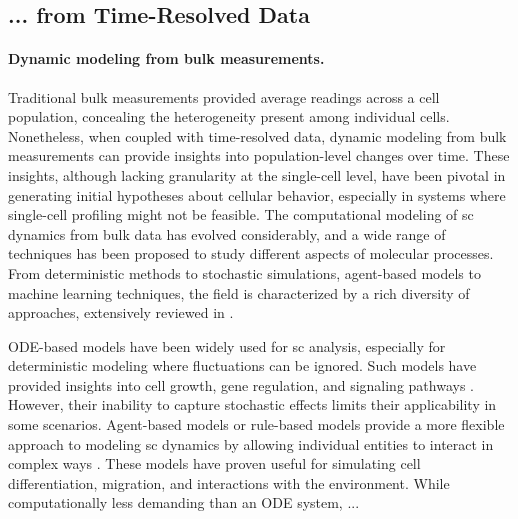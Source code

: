 
\subsection*{... from Time-Resolved Data}

\paragraph{Dynamic modeling from bulk measurements.}

Traditional bulk measurements provided average readings across a cell population, concealing the heterogeneity present among individual cells. Nonetheless, when coupled with time-resolved data, dynamic modeling from bulk measurements can provide insights into population-level changes over time. These insights, although lacking granularity at the single-cell level, have been pivotal in generating initial hypotheses about cellular behavior, especially in systems where single-cell profiling might not be feasible. The computational modeling of \acrlong{sc} dynamics from bulk data has evolved considerably, and a wide range of techniques has been proposed to study different aspects of molecular processes. From deterministic methods to stochastic simulations, agent-based models to machine learning techniques, the field is characterized by a rich diversity of approaches, extensively reviewed in \citep{klipp2016systems}.

ODE-based models have been widely used for \acrlong{sc} analysis, especially for deterministic modeling where fluctuations can be ignored. Such models have provided insights into cell growth, gene regulation, and signaling pathways \citep{busch2015fundamental, raue2015data2dynamics, tyson2003sniffers, alon2019introduction}. However, their inability to capture stochastic effects limits their applicability in some scenarios.
Agent-based models or rule-based models provide a more flexible approach to modeling \acrlong{sc} dynamics by allowing individual entities to interact in complex ways \citep{an2009agent}. These models have proven useful for simulating cell differentiation, migration, and interactions with the environment. While computationally less demanding than an ODE system, ...


